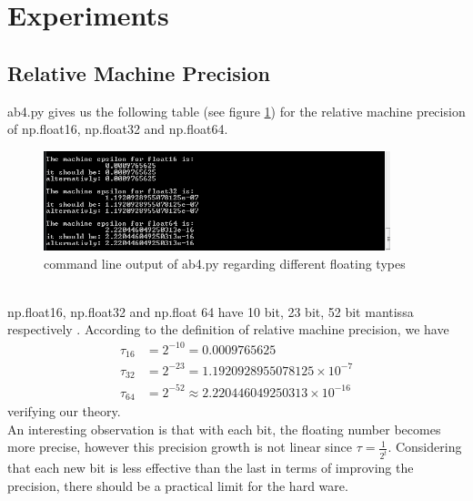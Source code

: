 \section{Experiments}
\subsection{Relative Machine Precision}
ab4.py gives us the following table (see figure \ref{fig:cmd_epsilon}) for the relative machine precision of np.float16, np.float32 and np.float64.
\begin{figure}[ht]
    \centering
        \includegraphics[width=0.9\textwidth]{graphics/cmd_epsilon}
    \caption{command line output of ab4.py regarding different floating types}\label{fig:cmd_epsilon}
\end{figure}\\
np.float16, np.float32 and np.float 64 have 10 bit, 23 bit, 52 bit mantissa respectively \cite{bib:numpy}. According to the definition of relative machine precision, we have
\begin{align*}
    \tau_{16} &= 2^{-10} = 0.0009765625 \\
    \tau_{32} &= 2^{-23} = 1.1920928955078125 \times 10^{-7} \\
    \tau_{64} &= 2^{-52} \approx 2.220446049250313 \times 10^{-16}
\end{align*}
verifying our theory. \\
An interesting observation is that with each bit, the floating number becomes more precise, however this precision growth is not linear since \(\tau = \frac{1}{2^t}\). Considering that each new bit is less effective than the last in terms of improving the precision, there should be a practical limit for the hard ware.
